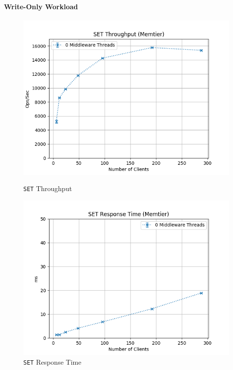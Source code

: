 \documentclass[11pt,a4paper]{article}
\begin{document}
\paragraph{Write-Only Workload}
%
\begin{figure}[H]
	\centering
    \begin{minipage}{0.5\textwidth}
        \centering
        \includegraphics[width=\textwidth]{../illustrations/plots/1_1_one_server/1-0/memtier_set_tp_s.png}
        \caption{\texttt{SET} Throughput}
        \label{fig:one_server_set_tp}
    \end{minipage}\hfill
    \begin{minipage}{0.5\textwidth}
        \centering
        \includegraphics[width=\textwidth]{../illustrations/plots/1_1_one_server/1-0/memtier_set_rt_ms.png}
        \caption{\texttt{SET} Response Time}
        \label{fig:one_server_set_rt}
    \end{minipage}
\end{figure}
\end{document}
